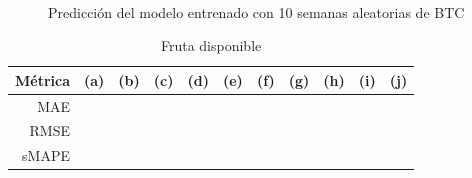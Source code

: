 \documentclass[a4paper,10pt]{article}
\begin{document}
\begin{figure}
    \\
  \caption{Predicción del modelo entrenado con 10 semanas aleatorias de BTC}
  \label{f:eth_wk_arima}
\end{figure}

\begin{table}[t]
 \begin{center}
  \begin{tabular}{|r|c|c|c|c|c|c|c|c|c|c|}
    Métrica & (a) & (b) & (c) & (d) & (e) & (f) & (g) & (h) & (i) & (j) \\ \hline
    MAE &  &  &  &  &  &  &  &  &  &  \\
    RMSE &  &  &  &  &  &  &  &  &  & \\
    sMAPE &  &  &  &  &  &  &  &  &  & \\ \hline
  \end{tabular}
  \caption{Fruta disponible}
  \label{tab:eth}
 \end{center}
\end{table}
\end{document}
